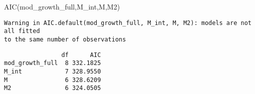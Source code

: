 \documentclass[
  letterpaper,
  DIV=11,
  numbers=noendperiod]{scrartcl}
\newenvironment{Shaded}{\begin{snugshade}}{\end{snugshade}}
\newcommand{\CommentTok}[1]{\textcolor[rgb]{0.37,0.37,0.37}{#1}}
\newcommand{\DecValTok}[1]{\textcolor[rgb]{0.68,0.00,0.00}{#1}}
\newcommand{\FunctionTok}[1]{\textcolor[rgb]{0.28,0.35,0.67}{#1}}
\newcommand{\NormalTok}[1]{\textcolor[rgb]{0.00,0.23,0.31}{#1}}
\newcommand{\SpecialCharTok}[1]{\textcolor[rgb]{0.37,0.37,0.37}{#1}}
\begin{document}
\begin{Shaded}
\begin{Highlighting}[]
\FunctionTok{AIC}\NormalTok{(mod\_growth\_full,M\_int,M,M2)}
\end{Highlighting}
\end{Shaded}

\begin{verbatim}
Warning in AIC.default(mod_growth_full, M_int, M, M2): models are not all fitted
to the same number of observations
\end{verbatim}

\begin{verbatim}
                df      AIC
mod_growth_full  8 332.1825
M_int            7 328.9550
M                6 328.6209
M2               6 324.0505
\end{verbatim}

\begin{Shaded}
\end{Shaded}
\end{document}
